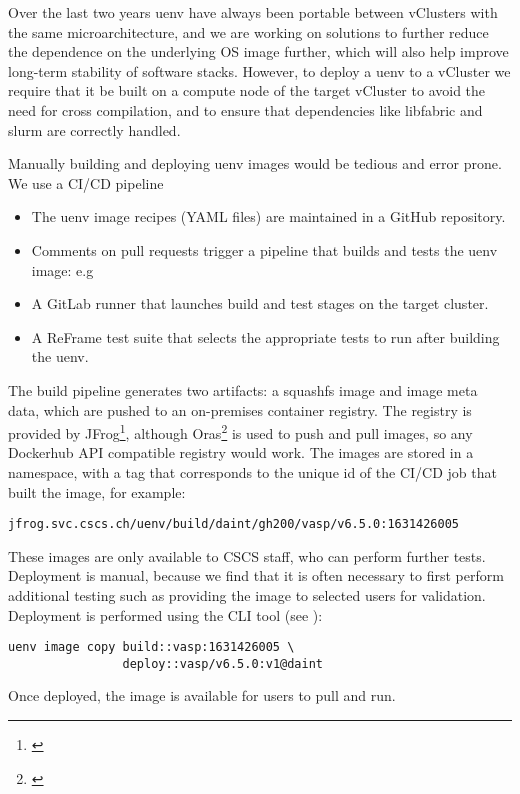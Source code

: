 Over the last two years uenv have always been portable between vClusters with the same microarchitecture, and we are working on solutions to further reduce the dependence on the underlying OS image further, which will also help improve long-term stability of software stacks.
However, to deploy a uenv to a vCluster we require that it be built on a compute node of the target vCluster to avoid the need for cross compilation, and to ensure that dependencies like libfabric and slurm are correctly handled.

Manually building and deploying uenv images would be tedious and error prone.
We use a CI/CD pipeline 
\begin{itemize}
    \item The uenv image recipes (YAML files) are maintained in a GitHub repository.
    \item Comments on pull requests trigger a pipeline that builds and tests the uenv image: e.g 
    \item A GitLab runner that launches build and test stages on the target cluster.
    \item A ReFrame test suite that selects the appropriate tests to run after building the uenv.
\end{itemize}

The build pipeline generates two artifacts: a squashfs image and image meta data, which are pushed to an on-premises container registry.
The registry is provided by JFrog\footnote{\href{https://jfrog.com}{}}, although Oras\footnote{\href{https://oras.land}{}} is used to push and pull images, so any Dockerhub API compatible registry would work.
The images are stored in a  namespace, with a tag that corresponds to the unique id of the CI/CD job that built the image, for example:
\begin{lstlisting}
jfrog.svc.cscs.ch/uenv/build/daint/gh200/vasp/v6.5.0:1631426005
\end{lstlisting}

These images are only available to CSCS staff, who can perform further tests.
Deployment is manual, because we find that it is often necessary to first perform additional testing such as providing the image to selected users for validation.
Deployment is performed using the CLI tool (see ):
\begin{lstlisting}
uenv image copy build::vasp:1631426005 \
                deploy::vasp/v6.5.0:v1@daint
\end{lstlisting}
Once deployed, the image is available for users to pull and run.

